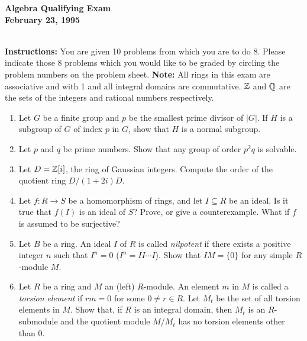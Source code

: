 \documentclass{article}
\begin{document}
\begin{Large}

\begin{center}\begin{LARGE}
{\bf  Algebra Qualifying Exam}\\ 
{\bf February 23, 1995}\\
\end{LARGE}
\end{center}
\vspace{0.1in}
\noindent\hrulefill\\
{\bf Instructions:} You are given 10 problems from which you are to do 8.
 Please indicate those  8 problems which you would like  to be graded 
by circling the problem numbers on the  problem sheet. 
{\bf Note:} All rings in this exam are associative and with 1 and 
all integral domains are commutative. $\Bbb Z $ and $ \Bbb Q $ are
the sets of the integers and rational numbers respectively.

\vspace{0.2in}

\begin{enumerate}
 \item  Let $ G $ be a finite group and $ p $ be the smallest prime divisor
 of $ | G | $. If $ H $ is a subgroup of $ G $ of index $ p $ in $ G $, 
show that $H$ is a normal subgroup.
\item Let $ p $ and $ q $ be  prime numbers. Show that any group of
order $ p^2 q $ is solvable. 

\item  Let $D=\Bbb Z[i]$, the ring of Gaussian integers. Compute
the order of the quotient ring $D/(1+2i)D$.

\item Let $f:R\to S$ be a homomorphism of rings, and let $I\subseteq R$
be an ideal. Is it true that $f(I)$ is an ideal of $S$? Prove, or
give a counterexample. What if $f$ is assumed to be surjective? 
 
\item Let $ B $ be a ring. An ideal $ I $ of $ R $ is 
called {\em nilpotent} if  
there exists a positive integer $n$ such that $ I^n=0 $ ($I^n=II\cdots I$).
Show that $IM= \{0\} $ for  any simple $ R $-module $ M $.

\item Let $ R $ be a ring and $ M $ an (left) $R$-module. An element $
m $ in $M$  is called a {\em torsion element} if $rm=0 $ for some   $0\neq r
\in R $. Let $ M_t $ be  the set of all
torsion elements in $ M $. Show that, if $ R $ is an integral domain,
then $ M_t $ is an $ R $-submodule and the quotient module $ M/M_t $
has no  torsion elements other than $ 0 $.


\end{enumerate}
\end{Large}
\end{document}
